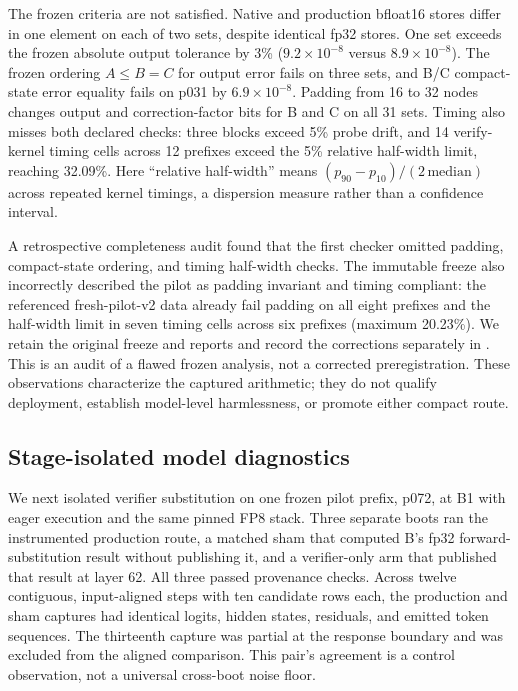 \documentclass[conference]{IEEEtran}
\begin{document}
The frozen criteria are not satisfied. Native and production bfloat16 stores differ in one element on each of two sets, despite identical fp32 stores. One set exceeds the frozen absolute output tolerance by 3\% ($9.2\times10^{-8}$ versus $8.9\times10^{-8}$). The frozen ordering $A\le B=C$ for output error fails on three sets, and B/C compact-state error equality fails on p031 by $6.9\times10^{-8}$. Padding from 16 to 32 nodes changes output and correction-factor bits for B and C on all 31 sets. Timing also misses both declared checks: three blocks exceed 5\% probe drift, and 14 verify-kernel timing cells across 12 prefixes exceed the 5\% relative half-width limit, reaching 32.09\%. Here ``relative half-width'' means $(p_{90}-p_{10})/(2\,\mathrm{median})$ across repeated kernel timings, a dispersion measure rather than a confidence interval.

A retrospective completeness audit found that the first checker omitted padding, compact-state ordering, and timing half-width checks. The immutable freeze also incorrectly described the pilot as padding invariant and timing compliant: the referenced fresh-pilot-v2 data already fail padding on all eight prefixes and the half-width limit in seven timing cells across six prefixes (maximum 20.23\%). We retain the original freeze and reports and record the corrections separately in . This is an audit of a flawed frozen analysis, not a corrected preregistration. These observations characterize the captured arithmetic; they do not qualify deployment, establish model-level harmlessness, or promote either compact route.

\subsection{Stage-isolated model diagnostics}
\label{sec:e7b-diagnostic}
We next isolated verifier substitution on one frozen pilot prefix, p072, at B1 with eager execution and the same pinned FP8 stack. Three separate boots ran the instrumented production route, a matched sham that computed B's fp32 forward-substitution result without publishing it, and a verifier-only arm that published that result at layer 62. All three passed provenance checks. Across twelve contiguous, input-aligned steps with ten candidate rows each, the production and sham captures had identical logits, hidden states, residuals, and emitted token sequences. The thirteenth capture was partial at the response boundary and was excluded from the aligned comparison. This pair's agreement is a control observation, not a universal cross-boot noise floor.
\end{document}
